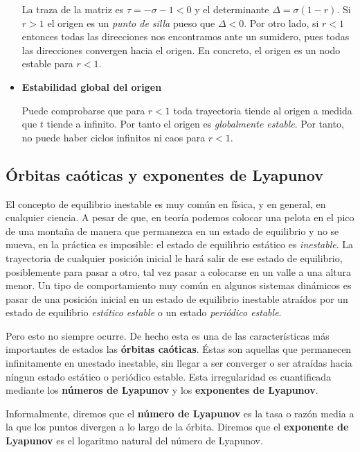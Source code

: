 \begin{itemize}
La traza de la matriz es $τ=-σ-1<0$ y el determinante $Δ = σ(1-r)$. Si $r>1$ el origen es un \emph{punto de silla} pueso que $Δ<0$. Por otro lado, si $r<1$ entonces todas las direcciones nos encontramos ante un sumidero, pues todas las direcciones convergen hacia el origen. En concreto, el origen es un nodo estable para $r<1$.

\item \textbf{Estabilidad global del origen}

Puede comprobarse que para $r<1$ toda trayectoria tiende al origen a medida que $t$ tiende a infinito. Por tanto el origen es \emph{globalmente estable}. Por tanto, no puede haber ciclos infinitos ni caos para $r<1$.

\end{itemize}

\subsection{Órbitas caóticas y exponentes de Lyapunov}

El concepto de equilibrio inestable es muy común en física, y en general, en cualquier ciencia. A pesar de que, en teoría podemos colocar una pelota en el pico de una montaña de manera que permanezca en un estado de equilibrio y no se mueva, en la práctica es imposible: el estado de equilibrio estático es \emph{inestable}. La trayectoria de cualquier posición inicial le hará salir de ese estado de equilibrio, posiblemente para pasar a otro, tal vez pasar a colocarse en un valle a una altura menor. Un tipo de comportamiento muy común en algunos sistemas dinámicos es pasar de una posición inicial en un estado de equilibrio inestable atraídos por un estado de equilibrio \emph{estático} \emph{estable} o un estado \emph{periódico estable}.

Pero esto no siempre ocurre. De hecho esta es una de las características más importantes de estados las \textbf{órbitas caóticas}. Éstas son aquellas que permanecen infinitamente en unestado inestable, sin llegar a ser converger o ser atraídas hacia níngun estado estático o periódico estable. Esta irregularidad es cuantificada mediante los \textbf{números de Lyapunov} y los \textbf{exponentes de Lyapunov}.

Informalmente, diremos que el \textbf{número de Lyapunov} es la tasa o razón media a la que los puntos divergen a lo largo de la órbita. Diremos que el \textbf{exponente de Lyapunov} es el logaritmo natural del número de Lyapunov.

